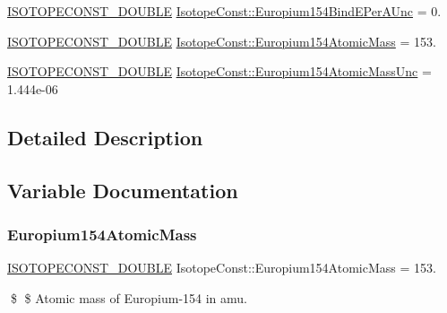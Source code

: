 \begin{DoxyCompactItemize}
\mbox{\hyperlink{group___isotope_const-_macros_ga8f45a7272ce02c0b4c65c44636ed719a}{I\+S\+O\+T\+O\+P\+E\+C\+O\+N\+S\+T\+\_\+\+D\+O\+U\+B\+LE}} \mbox{\hyperlink{group___isotope_const-_europium-_eu154_gaaaf7d572327d365078628864c197d083}{Isotope\+Const\+::\+Europium154\+Bind\+E\+Per\+A\+Unc}} = 0.
\item 
\mbox{\hyperlink{group___isotope_const-_macros_ga8f45a7272ce02c0b4c65c44636ed719a}{I\+S\+O\+T\+O\+P\+E\+C\+O\+N\+S\+T\+\_\+\+D\+O\+U\+B\+LE}} \mbox{\hyperlink{group___isotope_const-_europium-_eu154_ga39b28bd443ff3ce17c734325ac3fa45f}{Isotope\+Const\+::\+Europium154\+Atomic\+Mass}} = 153.
\item 
\mbox{\hyperlink{group___isotope_const-_macros_ga8f45a7272ce02c0b4c65c44636ed719a}{I\+S\+O\+T\+O\+P\+E\+C\+O\+N\+S\+T\+\_\+\+D\+O\+U\+B\+LE}} \mbox{\hyperlink{group___isotope_const-_europium-_eu154_gaa55934913c96eeaf5cee11d0d587620a}{Isotope\+Const\+::\+Europium154\+Atomic\+Mass\+Unc}} = 1.\+444e-\/06
\end{DoxyCompactItemize}


\subsection{Detailed Description}


\subsection{Variable Documentation}
\mbox{\label{group___isotope_const-_europium-_eu154_ga39b28bd443ff3ce17c734325ac3fa45f}} 
\subsubsection{\texorpdfstring{Europium154\+Atomic\+Mass}{Europium154AtomicMass}}
{\footnotesize\ttfamily \mbox{\hyperlink{group___isotope_const-_macros_ga8f45a7272ce02c0b4c65c44636ed719a}{I\+S\+O\+T\+O\+P\+E\+C\+O\+N\+S\+T\+\_\+\+D\+O\+U\+B\+LE}} Isotope\+Const\+::\+Europium154\+Atomic\+Mass = 153.}

\$ \$ Atomic mass of Europium-\/154 in amu. \mbox{\label{group___isotope_const-_europium-_eu154_gaa55934913c96eeaf5cee11d0d587620a}} 

